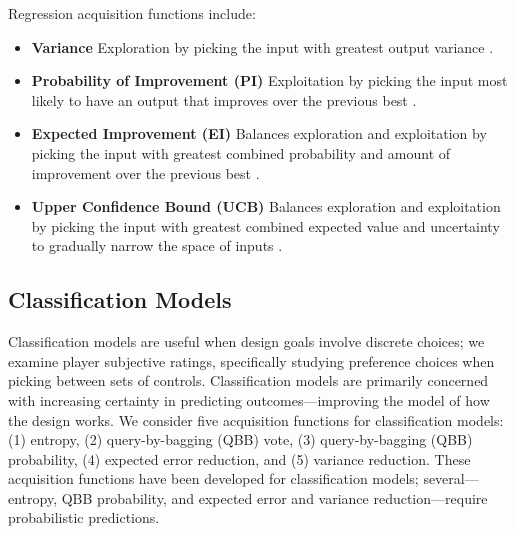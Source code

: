 \documentclass{sig-alternate}
\begin{document}
Regression acquisition functions include:
\begin{itemize}
%
\item \textbf{Variance} Exploration by picking the input with greatest output variance \cite{brochu2010:thesis}.
%
\item \textbf{Probability of Improvement (PI)} Exploitation by picking the input most likely to have an output that improves over the previous best \cite{brochu2010:thesis}.
%
\item \textbf{Expected Improvement (EI)} Balances exploration and exploitation by picking the input with greatest combined probability and amount of improvement over the previous best \cite{brochu2010:thesis}.
%
\item \textbf{Upper Confidence Bound (UCB)}
Balances exploration and exploitation by picking the input with greatest combined expected value and uncertainty to gradually narrow the space of inputs \cite{srinivas2010:gp-ucb}.
\end{itemize}



\subsection{Classification Models}
Classification models are useful when design goals involve discrete choices; we examine player subjective ratings, specifically studying preference choices when picking between sets of controls.
Classification models are primarily concerned with increasing certainty in predicting outcomes---improving the model of how the design works.
We consider five acquisition functions for classification models: (1) entropy, (2) query-by-bagging (QBB) vote, (3) query-by-bagging (QBB) probability, (4) expected error reduction, and (5) variance reduction.
These acquisition functions have been developed for classification models; several---entropy, QBB probability, and expected error and variance reduction---require probabilistic predictions.
\end{document}
